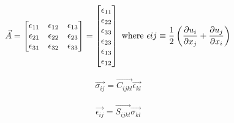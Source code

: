 \begin{equation}
\begin{split}
\vec{A} =
\begin{bmatrix}
\epsilon_{11} & \epsilon_{12} & \epsilon_{13}   \\
\epsilon_{21} & \epsilon_{22} & \epsilon_{23}   \\
\epsilon_{31} & \epsilon_{32} & \epsilon_{33}   \\
\end{bmatrix} = \begin{bmatrix}
\epsilon_{11} \\
\epsilon_{22} \\
\epsilon_{33} \\
\epsilon_{23} \\
\epsilon_{13} \\
\epsilon_{12} \\
\end{bmatrix}
\textnormal{ where }
\epsilon{ij} \equiv \frac{1}{2} \left(\frac{\partial u_i}{\partial x_j} + \frac{\partial u_j}{\partial x_i}\right)
\end{split}
\label{eq:strainTensor}
\end{equation}


\begin{equation}
  \begin{split}
    \vec{\sigma_{ij}} = \vec{C_{ijkl}} \vec{\epsilon_{kl}} 
  \end{split}
  \label{eq:eqStiffnessTensor}
\end{equation}


\begin{equation}
  \begin{split}
    \vec{\epsilon_{ij}} = \vec{S_{ijkl}} \vec{\sigma_{kl}} 
  \end{split}
  \label{eq:eqStiffnessTensor}
\end{equation}

\eqStrainTensorVoight

